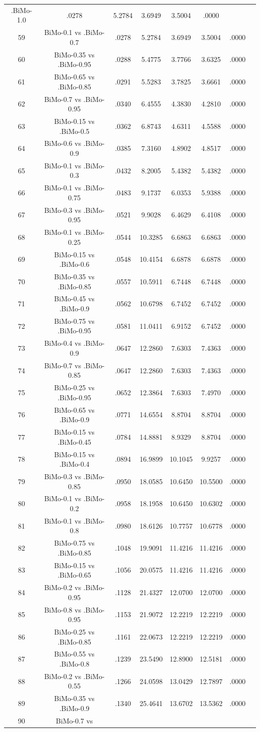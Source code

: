 \documentclass[a4paper,10pt]{article}
\begin{document}
\begin{landscape}
\begin{table}[!htp]
\begin{tabular}{cccccccc}
.BiMo-1.0&.0278&5.2784&3.6949&3.5004&.0000\\59&BiMo-0.1 vs .BiMo-0.7&.0278&5.2784&3.6949&3.5004&.0000\\60&BiMo-0.35 vs .BiMo-0.95&.0288&5.4775&3.7766&3.6325&.0000\\61&BiMo-0.65 vs .BiMo-0.85&.0291&5.5283&3.7825&3.6661&.0000\\62&BiMo-0.7 vs .BiMo-0.95&.0340&6.4555&4.3830&4.2810&.0000\\63&BiMo-0.15 vs .BiMo-0.5&.0362&6.8743&4.6311&4.5588&.0000\\64&BiMo-0.6 vs .BiMo-0.9&.0385&7.3160&4.8902&4.8517&.0000\\65&BiMo-0.1 vs .BiMo-0.3&.0432&8.2005&5.4382&5.4382&.0000\\66&BiMo-0.1 vs .BiMo-0.75&.0483&9.1737&6.0353&5.9388&.0000\\67&BiMo-0.3 vs .BiMo-0.95&.0521&9.9028&6.4629&6.4108&.0000\\68&BiMo-0.1 vs .BiMo-0.25&.0544&10.3285&6.6863&6.6863&.0000\\69&BiMo-0.15 vs .BiMo-0.6&.0548&10.4154&6.6878&6.6878&.0000\\70&BiMo-0.35 vs .BiMo-0.85&.0557&10.5911&6.7448&6.7448&.0000\\71&BiMo-0.45 vs .BiMo-0.9&.0562&10.6798&6.7452&6.7452&.0000\\72&BiMo-0.75 vs .BiMo-0.95&.0581&11.0411&6.9152&6.7452&.0000\\73&BiMo-0.4 vs .BiMo-0.9&.0647&12.2860&7.6303&7.4363&.0000\\74&BiMo-0.7 vs .BiMo-0.85&.0647&12.2860&7.6303&7.4363&.0000\\75&BiMo-0.25 vs .BiMo-0.95&.0652&12.3864&7.6303&7.4970&.0000\\76&BiMo-0.65 vs .BiMo-0.9&.0771&14.6554&8.8704&8.8704&.0000\\77&BiMo-0.15 vs .BiMo-0.45&.0784&14.8881&8.9329&8.8704&.0000\\78&BiMo-0.15 vs .BiMo-0.4&.0894&16.9899&10.1045&9.9257&.0000\\79&BiMo-0.3 vs .BiMo-0.85&.0950&18.0585&10.6450&10.5500&.0000\\80&BiMo-0.1 vs .BiMo-0.2&.0958&18.1958&10.6450&10.6302&.0000\\81&BiMo-0.1 vs .BiMo-0.8&.0980&18.6126&10.7757&10.6778&.0000\\82&BiMo-0.75 vs .BiMo-0.85&.1048&19.9091&11.4216&11.4216&.0000\\83&BiMo-0.15 vs .BiMo-0.65&.1056&20.0575&11.4216&11.4216&.0000\\84&BiMo-0.2 vs .BiMo-0.95&.1128&21.4327&12.0700&12.0700&.0000\\85&BiMo-0.8 vs .BiMo-0.95&.1153&21.9072&12.2219&12.2219&.0000\\86&BiMo-0.25 vs .BiMo-0.85&.1161&22.0673&12.2219&12.2219&.0000\\87&BiMo-0.55 vs .BiMo-0.8&.1239&23.5490&12.8900&12.5181&.0000\\88&BiMo-0.2 vs .BiMo-0.55&.1266&24.0598&13.0429&12.7897&.0000\\89&BiMo-0.35 vs .BiMo-0.9&.1340&25.4641&13.6702&13.5362&.0000\\90&BiMo-0.7 vs 
\end{tabular}
\end{table}
\end{landscape}
\end{document}
